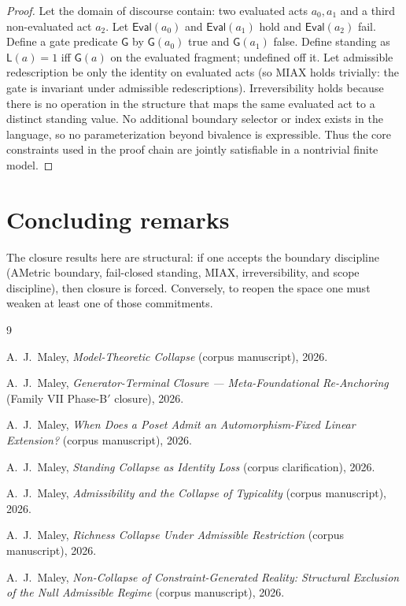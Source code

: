 \documentclass[11pt]{article}
\theoremstyle{definition}
\newcommand{\Eval}{\mathsf{Eval}}
\newcommand{\Gate}{\mathsf{G}}
\newcommand{\Stand}{\mathsf{L}}
\begin{document}
\begin{proof}
Let the domain of discourse contain: two evaluated acts $a_0,a_1$ and a third non-evaluated act $a_2$.
Let $\Eval(a_0)$ and $\Eval(a_1)$ hold and $\Eval(a_2)$ fail.
Define a gate predicate $\Gate$ by $\Gate(a_0)$ true and $\Gate(a_1)$ false.
Define standing as $\Stand(a)=1$ iff $\Gate(a)$ on the evaluated fragment; undefined off it.
Let admissible redescription be only the identity on evaluated acts (so MIAX holds trivially: the gate is invariant under admissible redescriptions).
Irreversibility holds because there is no operation in the structure that maps the same evaluated act to a distinct standing value.
No additional boundary selector or index exists in the language, so no parameterization beyond bivalence is expressible.
Thus the core constraints used in the proof chain are jointly satisfiable in a nontrivial finite model.
\end{proof}

\section{Concluding remarks}

The closure results here are structural: if one accepts the boundary discipline (AMetric boundary, fail-closed standing, MIAX, irreversibility, and scope discipline), then closure is forced.
Conversely, to reopen the space one must weaken at least one of those commitments.




\begin{thebibliography}{9}

A.~J.~Maley,
\emph{Model-Theoretic Collapse} (corpus manuscript), 2026.

A.~J.~Maley,
\emph{Generator-Terminal Closure --- Meta-Foundational Re-Anchoring} (Family VII Phase-B$'$ closure), 2026.

A.~J.~Maley,
\emph{When Does a Poset Admit an Automorphism-Fixed Linear Extension?} (corpus manuscript), 2026.

A.~J.~Maley,
\emph{Standing Collapse as Identity Loss} (corpus clarification), 2026.

A.~J.~Maley,
\emph{Admissibility and the Collapse of Typicality} (corpus manuscript), 2026.

A.~J.~Maley,
\emph{Richness Collapse Under Admissible Restriction} (corpus manuscript), 2026.

A.~J.~Maley,
\emph{Non-Collapse of Constraint-Generated Reality: Structural Exclusion of the Null Admissible Regime} (corpus manuscript), 2026.

\end{thebibliography}
\end{document}
